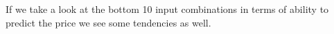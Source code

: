 If we take a look at the bottom 10 input combinations in terms of ability to predict the price we see some tendencies as well. 



